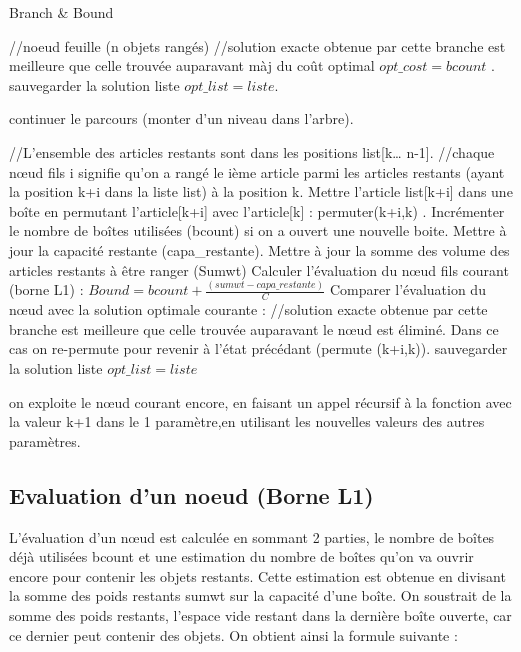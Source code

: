 \documentclass[12pt]{article}
\begin{document}
\begin{algorithm}[H]
    \caption{Branch \& Bound}
    \begin{algorithmic}
        \STATE //noeud feuille (n objets rangés)
            \STATE //solution exacte obtenue par cette branche est meilleure que celle trouvée auparavant
            \STATE màj du coût optimal $opt\_cost=bcount$ .
            \STATE sauvegarder la solution liste  $opt\_list=liste$. 
        
        \ELSE
            \STATE continuer le parcours (monter d’un niveau dans l’arbre).
       \ENDIF
        
    \ELSE

        \STATE //L’ensemble des articles restants sont dans les positions list[k… n-1].
        \STATE //chaque nœud fils i signifie qu’on a rangé le ième article parmi les articles restants (ayant la position k+i dans la liste list) à la position k.
            \STATE Mettre l’article list[k+i] dans une boîte en permutant l’article[k+i] avec l’article[k] : permuter(k+i,k) .
            \STATE Incrémenter le nombre de boîtes utilisées (bcount) si on a ouvert une nouvelle boite.
            \STATE Mettre à jour la capacité restante (capa\_restante).
            \STATE Mettre à jour la somme des volume des articles restants à être ranger (Sumwt)
            \STATE Calculer l’évaluation du nœud fils courant (borne L1) : $Bound=bcount+\frac{(sumwt-capa\_restante)}{C}$
            \STATE Comparer l’évaluation du nœud avec la solution optimale courante :
                \STATE //solution exacte obtenue par cette branche est meilleure que celle trouvée auparavant
                \STATE  le nœud est éliminé. Dans ce cas on re-permute pour revenir à l’état précédant (permute (k+i,k)). 
                \STATE sauvegarder la solution liste  $opt\_list=liste$ 
        
           \ELSE
                \STATE on exploite le nœud courant encore, en faisant un appel récursif à la fonction avec la valeur  k+1 dans le 1 paramètre,en utilisant les nouvelles valeurs des autres paramètres.
           \ENDIF


        \ENDFOR
    \ENDIF
    \end{algorithmic}
    \end{algorithm}
\subsection{Evaluation d'un noeud (Borne L1)}
L’évaluation d’un nœud est calculée en sommant 2 parties, le nombre de boîtes déjà utilisées bcount et une estimation du nombre de boîtes qu’on va ouvrir encore pour contenir les objets restants. Cette estimation est obtenue en divisant la somme des poids restants sumwt sur la capacité d’une boîte. On soustrait de la somme des poids restants, l’espace vide 
restant dans la dernière boîte ouverte, car ce dernier peut contenir des objets. On obtient ainsi la formule suivante :  
\end{document}

